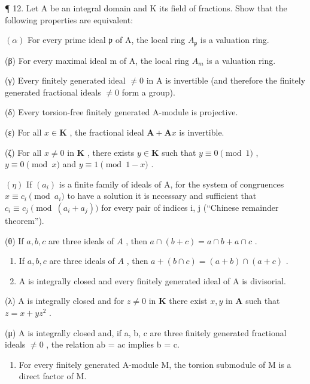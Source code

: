 ¶ 12. Let A be an integral domain and K its field of fractions. Show that the following properties are equivalent:

\((\alpha)\) For every prime ideal \(\mathfrak{p}\) of A, the local ring \(A_{\mathfrak{p}}\) is a valuation ring.

(β) For every maximal ideal m of A, the local ring \(A_{m}\) is a valuation ring.

(γ) Every finitely generated ideal \(\neq0\) in A is invertible (and therefore the finitely generated fractional ideals \(\neq0\) form a group).

(δ) Every torsion-free finitely generated A-module is projective.

(ε) For all \(x \in \mathbf{K}\) , the fractional ideal \(\mathbf{A} + \mathbf{A}x\) is invertible.

(ζ) For all \(x \neq 0\) in \(\mathbf{K}\) , there exists \(y \in \mathbf{K}\) such that \(y \equiv 0 \pmod{1}\) , \(y \equiv 0 \pmod{x}\) and \(y \equiv 1 \pmod{1 - x}\) .

\((\eta)\) If \((a_{i})\) is a finite family of ideals of A, for the system of congruences \(x \equiv c_{i} \pmod{a_{i}}\) to have a solution it is necessary and sufficient that \(c_{i} \equiv c_{j} \pmod{(a_{i} + a_{j})}\) for every pair of indices i, j (``Chinese remainder theorem'').

(θ) If \(a, b, c\) are three ideals of \(A\) , then \(a \cap (b + c) = a \cap b + a \cap c\) .

\begin{enumerate}
\def\labelenumi{(\roman{enumi})}
\item[(ι)]
  If \(a, b, c\) are three ideals of \(A\) , then \(a + (b \cap c) = (a + b) \cap (a + c)\) .
\item[(κ)]
  A is integrally closed and every finitely generated ideal of A is divisorial.
\end{enumerate}

(λ) A is integrally closed and for \(z \neq 0\) in \(\mathbf{K}\) there exist \(x, y\) in \(\mathbf{A}\) such that \(z = x + yz^2\) .

(μ) A is integrally closed and, if a, b, c are three finitely generated fractional ideals \(\neq0\) , the relation ab = ac implies b = c.

\begin{enumerate}
\def\labelenumi{(\alph{enumi})}
\setcounter{enumi}{21}
\tightlist
\item
  For every finitely generated A-module M, the torsion submodule of M is a direct factor of M.
\end{enumerate}

